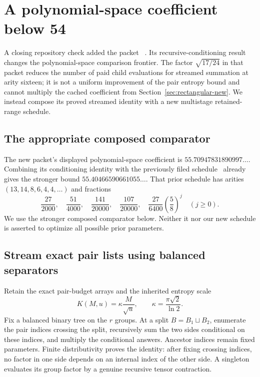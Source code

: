 \section{A polynomial-space coefficient below 54}
\label{sec:streamed-new}

A closing repository check added the packet ~\cite{adaptive}.
Its recursive-conditioning result changes the polynomial-space comparison
frontier. The factor $\sqrt{17/24}$ in that packet reduces the number of
paid child evaluations for streamed summation at arity sixteen; it is not
a uniform improvement of the pair entropy bound and cannot multiply the
cached coefficient from Section~\ref{sec:rectangular-new}. We instead compose
its proved streamed identity with a new multistage retained-range schedule.

\subsection{The appropriate composed comparator}

The new packet's displayed polynomial-space coefficient is
$55.70947831890997\ldots$. Combining its conditioning identity with the
previously filed  schedule~\cite{frontier} already gives
the stronger bound $55.40466590661055\ldots$. That prior schedule has arities
$(13,14,8,6,4,4,\ldots)$ and fractions
\[
 \frac{27}{2000},\quad\frac{51}{4000},\quad
 \frac{141}{20000},\quad\frac{107}{20000},\quad
 \frac{27}{6400}\left(\frac58\right)^j\quad(j\ge0).
\]
We use the stronger composed comparator below. Neither it nor our new
schedule is asserted to optimize all possible prior parameters.

\subsection{Stream exact pair lists using balanced separators}

Retain the exact pair-budget arrays and the inherited entropy scale
\[
 K(M,u)=\kappa\frac M{\sqrt u},\qquad
 \kappa=\frac{\pi\sqrt2}{\ln2}.
\]
Fix a balanced binary tree on the $r$ groups. At a split $B=B_1\sqcup B_2$,
enumerate the pair indices crossing the split, recursively sum the two sides
conditional on these indices, and multiply the conditional answers.
Ancestor indices remain fixed parameters. Finite distributivity proves the
identity: after fixing crossing indices, no factor in one side depends on
an internal index of the other side. A singleton evaluates its group factor
by a genuine recursive tensor contraction.

